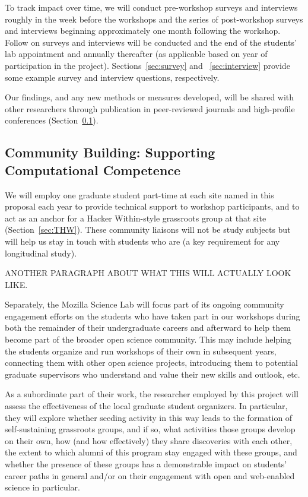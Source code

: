 \documentclass{proposalnsf}
\newlength{\up}
\begin{document}
To track impact over time, we will conduct pre-workshop surveys 
and interviews roughly in the week before the workshops and the
series of post-workshop surveys and interviews beginning approximately 
one month following the workshop. Follow on surveys and interviews
will be conducted and the end of the students' lab appointment 
and annually thereafter (as applicable based on year of participation
in the project). Sections~\ref{sec:survey} and ~\ref{sec:interview} provide some example survey and interview questions, respectively.

Our findings, and any new methods or measures developed, will be
shared with other researchers through publication in peer-reviewed
journals and high-profile conferences (Section~\ref{sec:pub}).

\subsection{Community Building: Supporting Computational Competence}
\label{sec:pub}

We will employ one graduate student part-time at each site named in this proposal each year to provide technical support to workshop participants,
and to act as an anchor for a Hacker Within-style grassroots group at
that site (Section~\ref{sec:THW}).  These community liaisons will not
be study subjects but will help us stay in touch with students who
are (a key requirement for any longitudinal study).

ANOTHER PARAGRAPH ABOUT WHAT THIS WILL ACTUALLY LOOK LIKE.

Separately, the Mozilla Science Lab will focus part of its ongoing
community engagement efforts on the students who have taken part in
our workshops during both the remainder of their undergraduate careers
and afterward to help them become part of the broader
open science community.  This may include helping the students
organize and run workshops of their own in subsequent years,
connecting them with other open science projects, introducing them to
potential graduate supervisors who understand and value their new
skills and outlook, etc.

As a subordinate part of their work, the researcher employed by this
project will assess the effectiveness of the local graduate student
organizers.  In particular, they will explore whether seeding activity
in this way leads to the formation of self-sustaining grassroots
groups, and if so, what activities those groups develop on their own,
how (and how effectively) they share discoveries with each other, the
extent to which alumni of this program stay engaged with these groups,
and whether the presence of these groups has a demonstrable impact on
students' career paths in general and/or on their engagement with
open and web-enabled science in particular.
\end{document}
